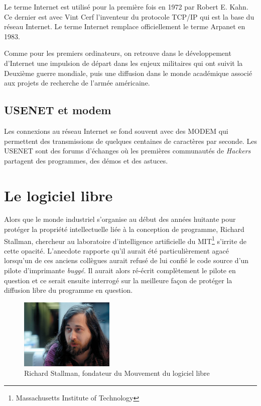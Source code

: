 \documentclass[a4paper,11pt]{book}
\begin{document}
Le terme Internet est utilisé pour la première fois en 1972 par Robert E. Kahn. Ce dernier est avec Vint Cerf l'inventeur du protocole TCP/IP qui est la base du réseau Internet. Le terme Internet remplace officiellement le terme Arpanet en 1983.

Comme pour les premiers ordinateurs, on retrouve dans le développement d'Internet une impulsion de départ dans les enjeux militaires qui ont suivit la Deuxième guerre mondiale, puis une diffusion dans le monde académique associé aux projets de recherche de l'armée américaine.

\subsection{USENET et modem}
Les connexions au réseau Internet se fond souvent avec des MODEM qui permettent des transmissions de quelques centaines de caractères par seconde. Les USENET sont des forums d'échanges où les premières communautés de \textit{Hackers} partagent des programmes, des démos et des astuces.

\section{Le logiciel libre}
Alors que le monde industriel s'organise au début des années huitante pour protéger la propriété intellectuelle liée à la conception de programme, Richard Stallman, chercheur au laboratoire d'intelligence artificielle du MIT\footnote{Massachusetts Institute of Technology} s'irrite de cette opacité. L'anecdote rapporte qu'il aurait été particulièrement agacé lorsqu'un de ces anciens collègues aurait refusé de lui confié le code source d'un pilote d'imprimante \textit{buggé}. Il aurait alors ré-écrit complètement le pilote en question et ce serait ensuite interrogé sur la meilleure façon de protéger la diffusion libre du programme en question. 

\begin{figure}[h]
    \centering
    \includegraphics[width=0.4\textwidth]{media/portraits/440px-Richard_Matthew_Stallman.jpeg}
    \caption{Richard Stallman, fondateur du Mouvement du logiciel libre}
    \label{stallman}
\end{figure}
\end{document}
